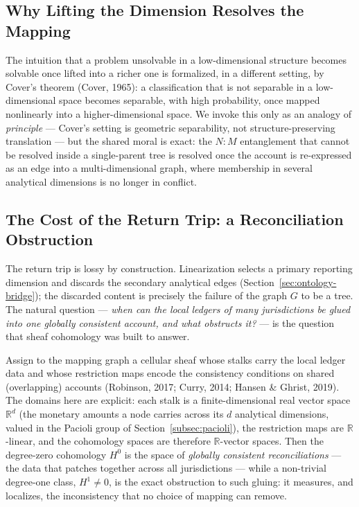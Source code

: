 \subsection{Why Lifting the Dimension Resolves the Mapping}
The intuition that a problem unsolvable in a low-dimensional structure becomes solvable once
lifted into a richer one is formalized, in a different setting, by Cover's theorem
(Cover, 1965): a classification that is not separable in a low-dimensional space becomes
separable, with high probability, once mapped nonlinearly into a higher-dimensional space.
We invoke this only as an analogy of \emph{principle} --- Cover's setting is geometric
separability, not structure-preserving translation --- but the shared moral is exact: the
$N{:}M$ entanglement that cannot be resolved inside a single-parent tree is resolved once the
account is re-expressed as an edge into a multi-dimensional graph, where membership in
several analytical dimensions is no longer in conflict.

\subsection{The Cost of the Return Trip: a Reconciliation Obstruction}
\label{subsec:reconciliation_obstruction}
The return trip is lossy by construction. Linearization selects a primary reporting
dimension and discards the secondary analytical edges
(Section~\ref{sec:ontology-bridge}); the discarded content is precisely the failure of the
graph $G$ to be a tree. The natural question --- \emph{when can the local ledgers of many
jurisdictions be glued into one globally consistent account, and what obstructs it?} --- is
the question that sheaf cohomology was built to answer.

Assign to the mapping graph a cellular sheaf whose stalks carry the local ledger data and
whose restriction maps encode the consistency conditions on shared (overlapping) accounts
(Robinson, 2017; Curry, 2014; Hansen \& Ghrist, 2019). The domains here are explicit: each
stalk is a finite-dimensional real vector space $\mathbb{R}^{d}$ (the monetary amounts a node
carries across its $d$ analytical dimensions, valued in the Pacioli group of
Section~\ref{subsec:pacioli}), the restriction maps are $\mathbb{R}$-linear, and the
cohomology spaces are therefore $\mathbb{R}$-vector spaces. Then the degree-zero cohomology
$H^{0}$ is the space of \emph{globally consistent reconciliations} --- the data that patches
together across all jurisdictions --- while a non-trivial degree-one class, $H^{1} \neq 0$,
is the exact obstruction to such gluing: it measures, and localizes, the inconsistency that
no choice of mapping can remove.

